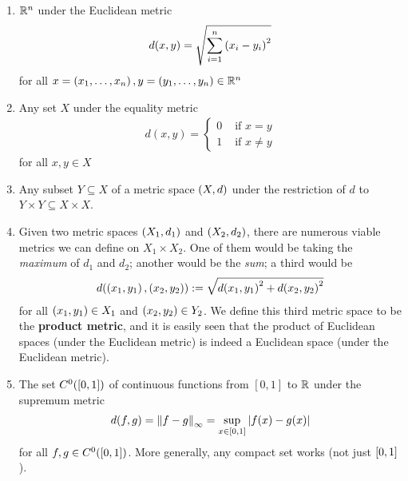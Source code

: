 \begin{boxexample} \hfill
    \begin{enumerate}
        \item $\mathbb{R}^n$ under the Euclidean metric
        \begin{align*}
            d\!\left( x, y \right) = \sqrt{\sum_{i=1}^{n} \left( x_i - y_i \right)^2}
        \end{align*}
        for all $x = \left( x_1, \ldots, x_n \right), y = \left( y_1, \ldots, y_n \right) \in \mathbb{R}^n$

        \item Any set $X$ under the equality metric
        \begin{align*}
            d(x, y) =
            \begin{cases}
                0 & \text{ if } x = y \\
                1 & \text{ if } x \neq y 
            \end{cases}
        \end{align*}
        for all $x, y \in X$

        \item Any subset $Y \subseteq X$ of a metric space $\left( X, d \right)$ under the restriction of $d$ to $Y \times Y \subseteq X \times X$.

        \item Given two metric spaces $\left( X_1, d_1 \right)$ and $\left( X_2, d_2 \right)$, there are numerous viable metrics we can define on $X_1 \times X_2$. One of them would be taking the \textit{maximum} of $d_1$ and $d_2$; another would be the \textit{sum}; a third would be
        \begin{align*}
            d\!\left( \left( x_1, y_1 \right) , \left( x_2, y_2 \right) \right) := \sqrt{d\!\left( x_1, y_1 \right)^2 + d\!\left( x_2, y_2 \right)^2}
        \end{align*}
        for all $\left( x_1, y_1 \right) \in X_1$ and $\left( x_2, y_2 \right) \in Y_2$. We define this third metric space to be the \textbf{product metric}, and it is easily seen that the product of Euclidean spaces (under the Euclidean metric) is indeed a Euclidean space (under the Euclidean metric).

        \item The set $C^0\!\left( \left[ 0, 1 \right] \right)$ of continuous functions from $[0, 1]$ to $\mathbb{R}$ under the supremum metric
        \begin{align*}
            d(f, g) = \left\lVert f - g \right\rVert_{\infty} = \sup_{x \in \left[ 0, 1 \right]} \left\lvert f(x) - g(x) \right\rvert
        \end{align*}
        for all $f, g \in C^{0}\!\left( \left[ 0, 1 \right] \right)$. More generally, any compact set works (not just $\left[ 0, 1 \right]$).


\end{enumerate}
\end{boxexample}
